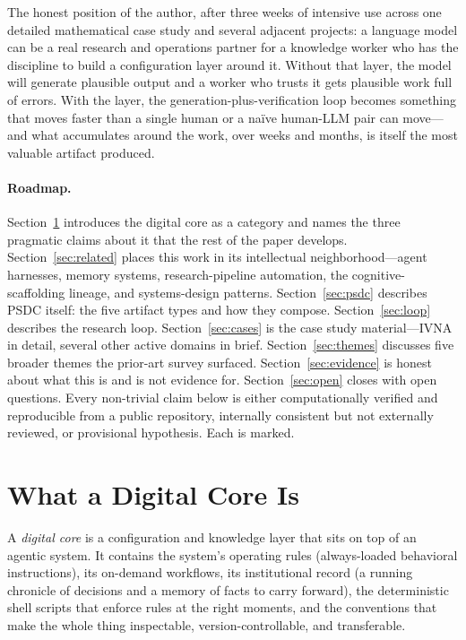 \documentclass[12pt]{article}
\begin{document}
The honest position of the author, after three weeks of intensive use across one detailed mathematical case study and several adjacent projects: a language model can be a real research and operations partner for a knowledge worker who has the discipline to build a configuration layer around it. Without that layer, the model will generate plausible output and a worker who trusts it gets plausible work full of errors. With the layer, the generation-plus-verification loop becomes something that moves faster than a single human or a naïve human-LLM pair can move---and what accumulates around the work, over weeks and months, is itself the most valuable artifact produced.

\paragraph{Roadmap.} Section~\ref{sec:concept} introduces the digital core as a category and names the three pragmatic claims about it that the rest of the paper develops. Section~\ref{sec:related} places this work in its intellectual neighborhood---agent harnesses, memory systems, research-pipeline automation, the cognitive-scaffolding lineage, and systems-design patterns. Section~\ref{sec:psdc} describes PSDC itself: the five artifact types and how they compose. Section~\ref{sec:loop} describes the research loop. Section~\ref{sec:cases} is the case study material---IVNA in detail, several other active domains in brief. Section~\ref{sec:themes} discusses five broader themes the prior-art survey surfaced. Section~\ref{sec:evidence} is honest about what this is and is not evidence for. Section~\ref{sec:open} closes with open questions. Every non-trivial claim below is either computationally verified and reproducible from a public repository, internally consistent but not externally reviewed, or provisional hypothesis. Each is marked.

\section{What a Digital Core Is}
\label{sec:concept}

A \emph{digital core} is a configuration and knowledge layer that sits on top of an agentic system. It contains the system's operating rules (always-loaded behavioral instructions), its on-demand workflows, its institutional record (a running chronicle of decisions and a memory of facts to carry forward), the deterministic shell scripts that enforce rules at the right moments, and the conventions that make the whole thing inspectable, version-controllable, and transferable.
\end{document}
